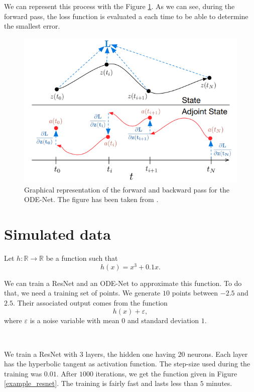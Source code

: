 \documentclass[10pt,a4paper]{article}
\theoremstyle{definition}
\theoremstyle{plain}
\begin{document}
We can represent this process with the Figure \ref{process}. As we can see, during the forward pass, the loss function is evaluated a each time to be able to determine the smallest error.
\begin{figure}[!h]
\center
\includegraphics[scale=0.7]{fig2.png}
\caption{Graphical representation of the forward and backward pass for the ODE-Net. The figure has been taken from \cite{12}.}
\label{process}
\end{figure}

\section{Simulated data}

Let $h: \mathbb{R} \to \mathbb{R}$ be a function such that
$$
h(x) = x^3 + 0.1x.
$$

We can train a ResNet and an ODE-Net to approximate this function.
To do that, we need a training set of points. We generate $10$ points between $-2.5$ and $2.5$. Their associated output comes from the function
$$
h(x) + \varepsilon,
$$
where $\varepsilon$ is a noise variable with mean $0$ and standard deviation $1$.

~

We train a ResNet with $3$ layers, the hidden one having $20$ neurons. Each layer has the hyperbolic tangent as activation function. The step-size used during the training was $0.01$. After $1000$ iterations, we get the function given in Figure \ref{example_resnet}. The training is fairly fast and lasts less than $5$ minutes.
\end{document}
